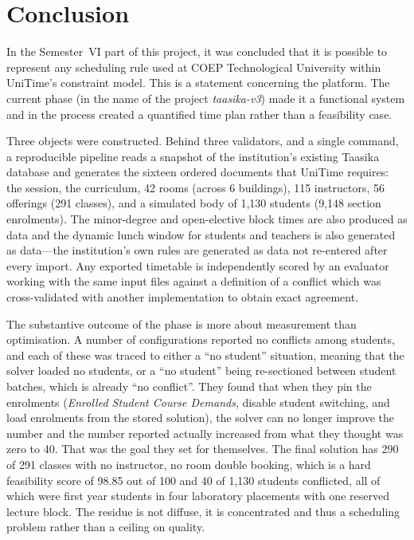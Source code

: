 \section{Conclusion}
\label{sec:conclusion}

In the Semester~VI part of this project, it was concluded that it is possible to represent any
scheduling rule used at COEP Technological University within UniTime's constraint model. This is a
statement concerning the platform. The current phase (in the name of the project
\emph{taasika-v3}) made it a functional system and in the process created a quantified time plan
rather than a feasibility case.

Three objects were constructed. Behind three validators, and a single command, a reproducible
pipeline reads a snapshot of the institution's existing Taasika database and generates the sixteen
ordered documents that UniTime requires: the session, the curriculum, 42 rooms (across 6
buildings), 115 instructors, 56 offerings (291 classes), and a simulated body of 1{,}130 students
(9{,}148 section enrolments). The minor-degree and open-elective block times are also produced as
data and the dynamic lunch window for students and teachers is also generated as data---the
institution's own rules are generated as data not re-entered after every import. Any exported
timetable is independently scored by an evaluator working with the same input files against a
definition of a conflict which was cross-validated with another implementation to obtain exact
agreement.

The substantive outcome of the phase is more about measurement than optimisation. A number of
configurations reported no conflicts among students, and each of these was traced to either a
``no student'' situation, meaning that the solver loaded no students, or a ``no student'' being
re-sectioned between student batches, which is already ``no conflict''. They found that when they
pin the enrolments (\emph{Enrolled Student Course Demands}, disable student switching, and load
enrolments from the stored solution), the solver can no longer improve the number and the number
reported actually increased from what they thought was zero to 40. That was the goal they set for
themselves. The final solution has 290 of 291 classes with no instructor, no room double booking,
which is a hard feasibility score of 98.85 out of 100 and 40 of 1{,}130 students conflicted, all
of which were first year students in four laboratory placements with one reserved lecture block.
The residue is not diffuse, it is concentrated and thus a scheduling problem rather than a ceiling
on quality.

